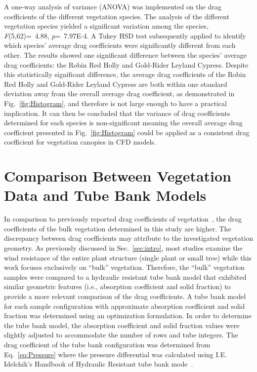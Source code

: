 \documentclass[12pt]{article}
\begin{document}
A one-way analysis of variance (ANOVA) was implemented on the drag coefficients of the different vegetation species. The analysis of the different vegetation species yielded a significant variation among the species, \textit{F}(5,62)=~4.88, \textit{p}=~7.97E-4. A Tukey HSD test subsequently applied to identify which species' average drag coefficients were significantly different from each other. The results showed one significant difference between the species' average drag coefficients: the Robin Red Holly and Gold-Rider Leyland Cypress. Despite this statistically significant difference, the average drag coefficients of the Robin Red Holly and Gold-Rider Leyland Cypress are both within one standard deviation away from the overall average drag coefficient, as demonstrated in Fig.~\ref{fig:Histogram},  and therefore is not large enough to have a practical implication. It can then be concluded that the variance of drag coefficients determined for each species is non-significant meaning the overall average drag coefficient presented in Fig.~\ref{fig:Histogram} could be applied as a consistent drag coefficient for vegetation canopies in CFD models.  

\section{Comparison Between Vegetation Data and Tube Bank Models}
\label{sec:comp}

In comparison to previously reported drag coefficients of vegetation~\cite{Cao2012,Jalonen2014,Mayhead1973,Gillies2002,Ishikawa2006}, the drag coefficients of the bulk vegetation determined in this study are higher. The discrepancy between drag coefficients may attribute to the investigated vegetation geometry. As previously discussed in Sec.~\ref{sec:intro}, most studies examine the wind resistance of the entire plant structure (single plant or small tree) while this work focuses exclusively on ``bulk'' vegetation. Therefore, the ``bulk'' vegetation samples were compared to a hydraulic resistant tube bank model that exhibited similar geometric features (i.e., absorption coefficient and solid fraction) to provide a more relevant comparison of the drag coefficients. A tube bank model for each sample configuration with approximate absorption coefficient and solid fraction was determined using an optimization formulation. In order to determine the tube bank model, the absorption coefficient and solid fraction values were slightly adjusted to accommodate the number of rows and tube integers. The drag coefficient of the tube bank configuration was determined from Eq.~\ref{eq:Pressure} where the pressure differential was calculated using I.E. Idelchik's Handbook of Hydraulic Resistant tube bank mode~\cite{Idelchick1994}.
\end{document}
